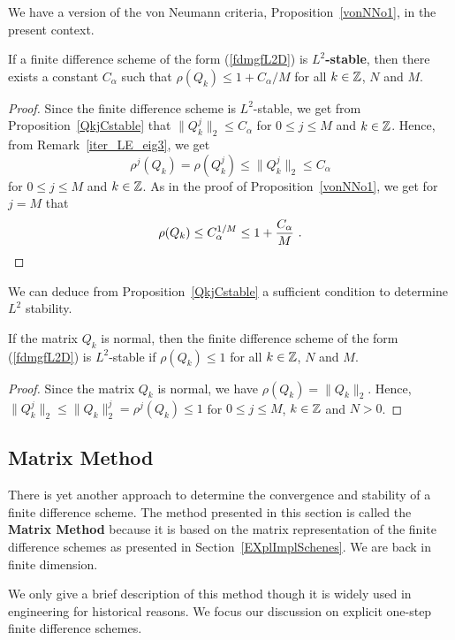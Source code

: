 We have a version of the von Neumann criteria,
Proposition~\ref{vonNNo1}, in the present context.

\begin{prop}
If a finite difference scheme of the form (\ref{fdmgfL2D}) is
{\bfseries $L^2$-stable}, then there exists a constant $C_\alpha$ such that
$\rho(Q_k) \leq 1 + C_\alpha/M$ for all $k \in \mathbb{Z}$, $N$ and $M$.
\end{prop}

\begin{proof}
Since the finite difference scheme is $L^2$-stable, we get from
Proposition~\ref{QkjCstable} that
$\|Q_k^j\|_2 \leq C_\alpha$ for $0\leq j \leq M$ and $k \in \mathbb{Z}$.
Hence, from Remark~\ref{iter_LE_eig3}, we get
\[
  \rho^j(Q_k) = \rho(Q_k^j) \leq \|Q_k^j\|_2 \leq C_\alpha
\]
for $0\leq j \leq M$ and $k \in \mathbb{Z}$.  As in the proof of
Proposition~\ref{vonNNo1}, we get for $j=M$ that
\[
  \rho(Q_k) \leq C_\alpha^{1/M} \leq 1 + \frac{C_\alpha}{M} \ . \qedhere
\]
\end{proof}

We can deduce from Proposition~\ref{QkjCstable} a sufficient
condition to determine $L^2$ stability.

\begin{prop}
If the matrix $Q_k$ is normal, then the finite difference scheme of
the form (\ref{fdmgfL2D}) is $L^2$-stable if $\rho(Q_k) \leq 1$
for all $k \in \mathbb{Z}$, $N$ and $M$.
\end{prop}

\begin{proof}
Since the matrix $Q_k$ is normal, we have $\rho(Q_k) = \|Q_k\|_2$.  Hence,
$\|Q_k^j\|_2 \leq \|Q_k\|_2^j = \rho^j(Q_k) \leq 1$ for
$0\leq j \leq M$, $k \in \mathbb{Z}$ and $N>0$.
\end{proof}

\subsection{Matrix Method} \label{Moreell2Stab}

There is yet another approach to determine the convergence and stability
of a finite difference scheme.  The method presented in this section
is called the
{\bfseries Matrix Method}
because it is based on the matrix representation of the finite
difference schemes as presented in Section~\ref{EXplImplSchenes}.
We are back in finite dimension.

We only give a brief description of this method though it is widely
used in engineering for historical reasons.  We focus our discussion
on explicit one-step finite difference schemes. 

